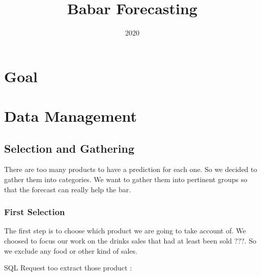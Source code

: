 \documentclass{report}
\title{Babar Forecasting}
\date{2020}
\begin{document}
 
\maketitle

\chapter{Goal}


\chapter{Data Management}

\section{Selection and Gathering}

There are too many products to have a prediction for each one. So we decided to gather them into categories. We want to gather them into pertinent groups so that the forecast can really help the bar. 

\subsection{First Selection}

The first step is to choose which product we are going to take account of. We choosed to focus our work on the drinks sales that had at least been sold ???. So we exclude any food or other kind of sales. 

SQL Request too extract those product : \\
 \\
\end{document}
